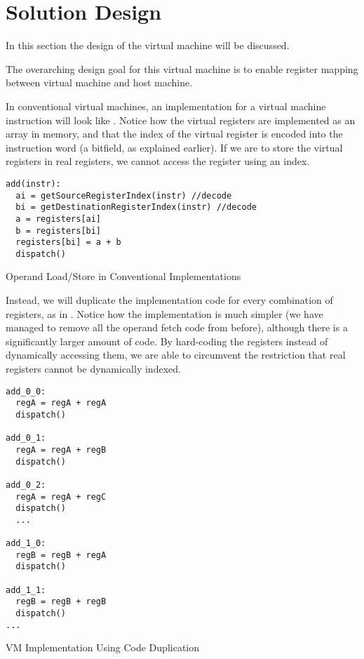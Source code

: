 \chapter{Solution Design}
	In this section the design of the virtual machine will be discussed. 
	
	The overarching design goal for this virtual machine is to enable register mapping between virtual machine and host machine.
	
	In conventional virtual machines, an implementation for a virtual machine instruction will look like . Notice how the virtual registers are implemented as an array in memory, and that the index of the virtual register is encoded into the instruction word (a bitfield, as explained earlier). If we are to store the virtual registers in real registers, we cannot access the register using an index.
	
	
	\begin{myfigure}
		\begin{lstlisting}
add(instr):
  ai = getSourceRegisterIndex(instr) //decode
  bi = getDestinationRegisterIndex(instr) //decode
  a = registers[ai]
  b = registers[bi]
  registers[bi] = a + b
  dispatch()
		\end{lstlisting}
		\caption{Operand Load/Store in Conventional Implementations}
		\label{fig:operandfetch}
	\end{myfigure}
	
	Instead, we will duplicate the implementation code for every combination of registers, as in . Notice how the implementation is much simpler (we have managed to remove all the operand fetch code from before), although there is a significantly larger amount of code. By hard-coding the registers instead of dynamically accessing them, we are able to circumvent the restriction that real registers cannot be dynamically indexed.
	
	\begin{myfigure}
		\begin{lstlisting}
add_0_0:
  regA = regA + regA
  dispatch()

add_0_1:
  regA = regA + regB
  dispatch()

add_0_2:
  regA = regA + regC
  dispatch()
  ...

add_1_0:
  regB = regB + regA
  dispatch()

add_1_1:
  regB = regB + regB
  dispatch()
...		
		\end{lstlisting}
		\caption{VM Implementation Using Code Duplication}
		\label{fig:dupimplementation}
	\end{myfigure}
	
